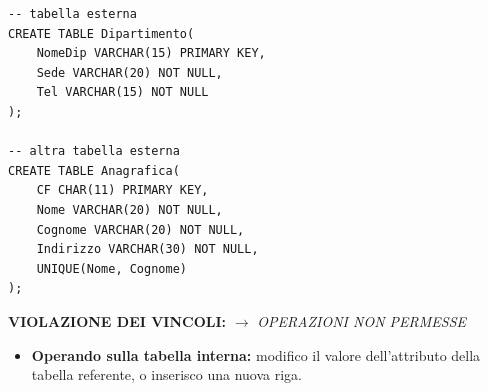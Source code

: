 \documentclass{article}
\begin{document}
\begin{itemize}
\begin{lstlisting}[style=sqlstyle]
-- tabella esterna
CREATE TABLE Dipartimento(
    NomeDip VARCHAR(15) PRIMARY KEY,
    Sede VARCHAR(20) NOT NULL,
    Tel VARCHAR(15) NOT NULL
);

-- altra tabella esterna
CREATE TABLE Anagrafica(
    CF CHAR(11) PRIMARY KEY,
    Nome VARCHAR(20) NOT NULL,
    Cognome VARCHAR(20) NOT NULL,
    Indirizzo VARCHAR(30) NOT NULL,
    UNIQUE(Nome, Cognome)
);
\end{lstlisting}

\textbf{VIOLAZIONE DEI VINCOLI:} $\to$ \textit{OPERAZIONI NON PERMESSE}

\begin{itemize}
\item \textbf{Operando sulla tabella interna:} modifico il valore dell'attributo della tabella referente, o inserisco una nuova riga.
\end{itemize}

\end{itemize}
\end{document}
